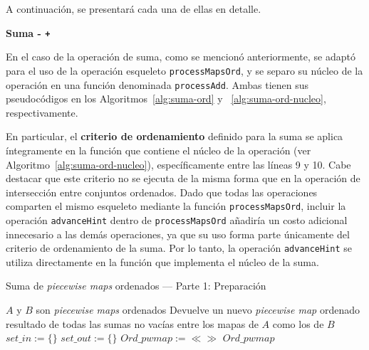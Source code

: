 A continuación, se presentará cada una de ellas en detalle.

{\bf Suma - \texttt{+}}

En el caso de la operación de suma, como se mencionó anteriormente, se adaptó para el uso de la operación esqueleto \texttt{processMapsOrd}, y se separo su núcleo de la operación en una función denominada \texttt{processAdd}. Ambas tienen sus pseudocódigos en los Algoritmos~\ref{alg:suma-ord} y ~\ref{alg:suma-ord-nucleo}, respectivamente.

En particular, el \textbf{criterio de ordenamiento} definido para la suma se aplica íntegramente en la función que contiene el núcleo de la operación (ver Algoritmo~\ref{alg:suma-ord-nucleo}), específicamente entre las líneas 9 y 10.  
Cabe destacar que este criterio no se ejecuta de la misma forma que en la operación de intersección entre conjuntos ordenados.  
Dado que todas las operaciones comparten el mismo esqueleto mediante la función \texttt{processMapsOrd}, incluir la operación \texttt{advanceHint} dentro de \texttt{processMapsOrd} añadiría un costo adicional innecesario a las demás operaciones, ya que su uso forma parte únicamente del criterio de ordenamiento de la suma.  
Por lo tanto, la operación \texttt{advanceHint} se utiliza directamente en la función que implementa el núcleo de la suma.

\begin{algorithm}
\caption{Suma de \textit{piecewise maps} ordenados — Parte 1: Preparación}
\label{alg:suma-ord}
\begin{algorithmic}[1]
\Require $A$ y $B$ son \textit{piecewise maps} ordenados
\Ensure Devuelve un nuevo \textit{piecewise map} ordenado resultado de todas las sumas no vacías entre los mapas de $A$ como los de $B$
    \State $set\_in := \{\}$
    \State $set\_out := \{\}$
    \State $Ord\_pwmap := \ll\gg$
    \State {}
    \State \Return $Ord\_pwmap$
\EndFunction
\end{algorithmic}
\end{algorithm}

